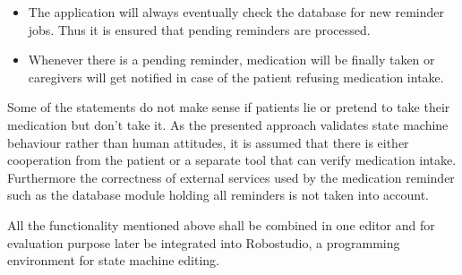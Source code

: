 \begin{itemize}
	\item The application will always eventually check the database for new reminder jobs. Thus it is ensured that pending reminders are processed.
	\item Whenever there is a pending reminder, medication will be finally taken or caregivers will get notified in case of the patient refusing medication intake.
\end{itemize}

Some of the statements do not make sense if patients lie or pretend to take their medication but don't take it. As the presented approach validates state machine behaviour rather than human attitudes, it is assumed that there is either cooperation from the patient or a separate tool that can verify medication intake. Furthermore the correctness of external services used by the medication reminder such as the database module holding all reminders is not taken into account.

All the functionality mentioned above shall be combined in one editor and for evaluation purpose later be integrated into Robostudio, a programming environment for state machine editing.